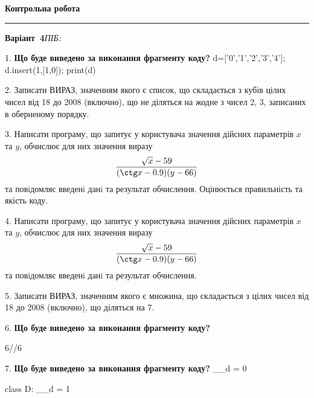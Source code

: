 \documentclass[11pt]{article}
\begin{document}
{\centering\Large\bfseries Контрольна робота\par}
\medskip
\noindent\rule{\linewidth}{0.5pt}
\smallskip
\noindent\textbf{Варіант \No\,4}\hfill \textit{ПІБ:}\,\underline{\hspace{60mm}}
\vspace{4mm}

1. \textbf{Що буде виведено за виконання фрагменту коду?}
d=['0','1','2','3','4']; d.insert(1,[1,0]); print(d)\par\vspace{5mm}

2. 
Записати ВИРАЗ, значенням якого є список, що складається з кубів цілих чисел від 18 до 2008 (включно), що не діляться на жодне з чисел 2, 3, записаних в оберненому порядку.\par\vspace{5mm}

3. 
Написати програму, що запитує у користувача значення дійсних параметрів $x$ та $y$, обчислює для них значення виразу 
$$\frac{\sqrt x - 59}{(\ctg x - 0.9) (y - 66)}$$ 
та повiдомляє введенi данi та результат обчислення.
 Оцінюється правильність та якість коду.

\par\vspace{5mm}

4. 
Написати програму, що запитує у користувача значення дійсних параметрів $x$ та $y$, обчислює для них значення виразу 
$$\frac{\sqrt x - 59}{(\ctg x - 0.9) (y - 66)}$$ 
та повiдомляє введенi данi та результат обчислення.

\par\vspace{5mm}

5. 
Записати ВИРАЗ, значенням якого є множина, що складається з цілих чисел від 18 до 2008 (включно), що діляться на 7.\par\vspace{5mm}

6. \textbf{Що буде виведено за виконання фрагменту коду?}

6//6%
\par\vspace{5mm}

7. \textbf{Що буде виведено за виконання фрагменту коду?}
__d = 0

class D:
    __d = 1
    
\end{document}

